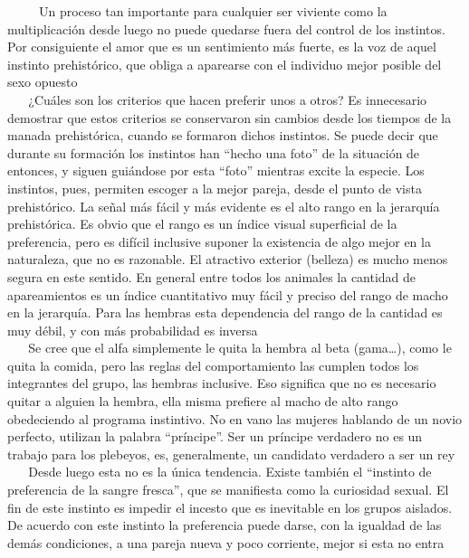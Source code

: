 ~ ~ ~ Un proceso tan importante para cualquier ser viviente como la
multiplicación desde luego no puede quedarse fuera del control de los
instintos. Por consiguiente el amor que es un sentimiento más fuerte, es
la voz de aquel instinto prehistórico, que obliga a aparearse con el
individuo mejor posible del sexo opuesto\\
\hspace*{0.333em} ~ ~ ¿Cuáles son los criterios que hacen preferir unos
a otros? Es innecesario demostrar que estos criterios se conservaron sin
cambios desde los tiempos de la manada prehistórica, cuando se formaron
dichos instintos. Se puede decir que durante su formación los instintos
han ``hecho una foto'' de la situación de entonces, y siguen guiándose
por esta ``foto'' mientras excite la especie. Los instintos, pues,
permiten escoger a la mejor pareja, desde el punto de vista
prehistórico. La señal más fácil y más evidente es el alto rango en la
jerarquía prehistórica. Es obvio que el rango es un índice visual
superficial de la preferencia, pero es difícil inclusive suponer la
existencia de algo mejor en la naturaleza, que no es razonable. El
atractivo exterior (belleza) es mucho menos segura en este sentido. En
general entre todos los animales la cantidad de apareamientos es un
índice cuantitativo muy fácil y preciso del rango de macho en la
jerarquía. Para las hembras esta dependencia del rango de la cantidad es
muy débil, y con más probabilidad es inversa\\
\hspace*{0.333em} ~ ~ Se cree que el alfa simplemente le quita la hembra
al beta (gama\ldots{}), como le quita la comida, pero las reglas del
comportamiento las cumplen todos los integrantes del grupo, las hembras
inclusive. Eso significa que no es necesario quitar a alguien la hembra,
ella misma prefiere al macho de alto rango obedeciendo al programa
instintivo. No en vano las mujeres hablando de un novio perfecto,
utilizan la palabra ``príncipe''. Ser un príncipe verdadero no es un
trabajo para los plebeyos, es, generalmente, un candidato verdadero a
ser un rey\\
\hspace*{0.333em} ~ ~ Desde luego esta no es la única tendencia. Existe
también el ``instinto de preferencia de la sangre fresca'', que se
manifiesta como la curiosidad sexual. El fin de este instinto es impedir
el incesto que es inevitable en los grupos aislados. De acuerdo con este
instinto la preferencia puede darse, con la igualdad de las demás
condiciones, a una pareja nueva y poco corriente, mejor si esta no entra
